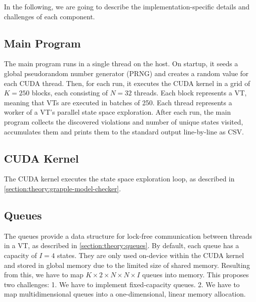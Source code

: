 \documentclass[
fancyheadings, %
%
%
]{stsreprt}
\begin{document}

In the following, we are going to describe the implementation-specific details and challenges of each component.

\subsection{Main Program}

The main program runs in a single thread on the host.
On startup, it seeds a global pseudorandom number generator (PRNG) and creates a random value for each CUDA thread.
Then, for each run, it executes the CUDA kernel in a grid of $K=250$ blocks, each consisting of $N=32$ threads.
Each block represents a VT, meaning that VTs are executed in batches of 250.
Each thread represents a worker of a VT's parallel state space exploration.
After each run, the main program collects the discovered violations and number of unique states visited, accumulates them and prints them to the standard output line-by-line as CSV.

\subsection{CUDA Kernel}

The CUDA kernel executes the state space exploration loop, as described in \cref{section:theory:grapple-model-checker}.


\subsection{Queues}

The queues provide a data structure for lock-free communication between threads in a VT, as described in \cref{section:theory:queues}.
By default, each queue has a capacity of $I=4$ states.
They are only used on-device within the CUDA kernel and stored in global memory due to the limited size of shared memory.
Resulting from this, we have to map $K \times 2 \times N \times N \times I$ queues into memory.
This proposes two challenges:
1. We have to implement fixed-capacity queues.
2. We have to map multidimensional queues into a one-dimensional, linear memory allocation.
\end{document}
